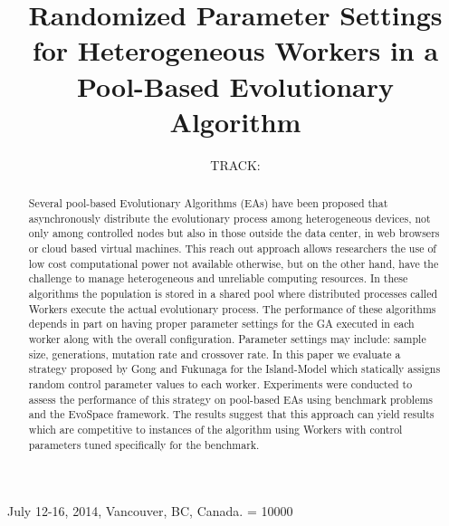 \documentclass{sig-alternate}
\begin{document}
\title{ Randomized Parameter Settings for Heterogeneous Workers in a Pool-Based Evolutionary Algorithm}
\subtitle{TRACK: }

 {July 12-16, 2014, Vancouver, BC, Canada.}
    \widowpenalty = 10000

%
%

\maketitle              %

\begin{abstract}
Several pool-based Evolutionary Algorithms (EAs) have been proposed that asynchronously distribute the evolutionary process among heterogeneous devices, not only among controlled nodes but also in those outside the data center, in web browsers or cloud based virtual machines. This reach out approach allows researchers the use of low cost computational power not available otherwise, but on the other hand, have the challenge to manage heterogeneous and unreliable computing resources. In these algorithms the population is stored in a shared pool where distributed processes called Workers execute the actual evolutionary process. The performance of these algorithms depends in part on having proper parameter settings for the GA executed in each worker along with the overall configuration. Parameter settings may include: sample size, generations, mutation rate and crossover rate. In this paper we evaluate a strategy proposed by Gong and Fukunaga for the Island-Model which statically assigns random control parameter values to each worker. Experiments were conducted to assess the performance of this strategy on pool-based EAs using benchmark problems and the EvoSpace framework. The results suggest that this approach can yield results which are competitive to instances of the algorithm using Workers with control parameters tuned specifically for the benchmark. 
\end{abstract}
\end{document}
